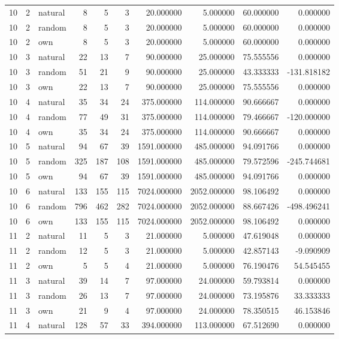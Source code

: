 \begin{table}[htbp]
\begin{tabular}{rrlrrrrrrr}
10 & 2 & natural & 8 & 5 & 3 & 20.000000 & 5.000000 & 60.000000 & 0.000000 \\
10 & 2 & random & 8 & 5 & 3 & 20.000000 & 5.000000 & 60.000000 & 0.000000 \\
10 & 2 & own & 8 & 5 & 3 & 20.000000 & 5.000000 & 60.000000 & 0.000000 \\
10 & 3 & natural & 22 & 13 & 7 & 90.000000 & 25.000000 & 75.555556 & 0.000000 \\
10 & 3 & random & 51 & 21 & 9 & 90.000000 & 25.000000 & 43.333333 & -131.818182 \\
10 & 3 & own & 22 & 13 & 7 & 90.000000 & 25.000000 & 75.555556 & 0.000000 \\
10 & 4 & natural & 35 & 34 & 24 & 375.000000 & 114.000000 & 90.666667 & 0.000000 \\
10 & 4 & random & 77 & 49 & 31 & 375.000000 & 114.000000 & 79.466667 & -120.000000 \\
10 & 4 & own & 35 & 34 & 24 & 375.000000 & 114.000000 & 90.666667 & 0.000000 \\
10 & 5 & natural & 94 & 67 & 39 & 1591.000000 & 485.000000 & 94.091766 & 0.000000 \\
10 & 5 & random & 325 & 187 & 108 & 1591.000000 & 485.000000 & 79.572596 & -245.744681 \\
10 & 5 & own & 94 & 67 & 39 & 1591.000000 & 485.000000 & 94.091766 & 0.000000 \\
10 & 6 & natural & 133 & 155 & 115 & 7024.000000 & 2052.000000 & 98.106492 & 0.000000 \\
10 & 6 & random & 796 & 462 & 282 & 7024.000000 & 2052.000000 & 88.667426 & -498.496241 \\
10 & 6 & own & 133 & 155 & 115 & 7024.000000 & 2052.000000 & 98.106492 & 0.000000 \\
11 & 2 & natural & 11 & 5 & 3 & 21.000000 & 5.000000 & 47.619048 & 0.000000 \\
11 & 2 & random & 12 & 5 & 3 & 21.000000 & 5.000000 & 42.857143 & -9.090909 \\
11 & 2 & own & 5 & 5 & 4 & 21.000000 & 5.000000 & 76.190476 & 54.545455 \\
11 & 3 & natural & 39 & 14 & 7 & 97.000000 & 24.000000 & 59.793814 & 0.000000 \\
11 & 3 & random & 26 & 13 & 7 & 97.000000 & 24.000000 & 73.195876 & 33.333333 \\
11 & 3 & own & 21 & 9 & 4 & 97.000000 & 24.000000 & 78.350515 & 46.153846 \\
11 & 4 & natural & 128 & 57 & 33 & 394.000000 & 113.000000 & 67.512690 & 0.000000 \\

\end{tabular}
\end{table}
